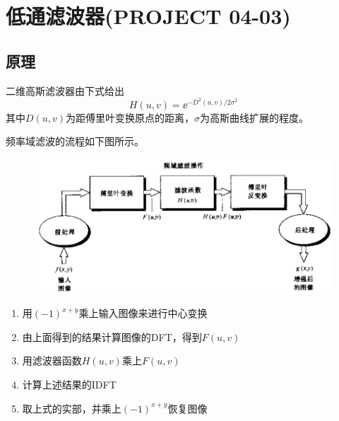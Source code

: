 \documentclass[logo,reportComp]{thesis}
\begin{document}
\section{低通滤波器(PROJECT 04-03)}
\subsection{原理}
二维高斯滤波器由下式给出
\[H(u,v)=\ee^{-D^2(u,v)/2\sigma^2}\]
其中$D(u,v)$为距傅里叶变换原点的距离，$\sigma$为高斯曲线扩展的程度。

频率域滤波的流程如下图所示。
\begin{figure}[H]
\centering
\includegraphics[width=0.8\linewidth]{fig/process.png}
\end{figure}
\begin{enumerate}
    \item 用$(-1)^{x+y}$乘上输入图像来进行中心变换
    \item 由上面得到的结果计算图像的DFT，得到$F(u,v)$
    \item 用滤波器函数$H(u,v)$乘上$F(u,v)$
    \item 计算上述结果的IDFT
    \item 取上式的实部，并乘上$(-1)^{x+y}$恢复图像
\end{enumerate}
\end{document}
